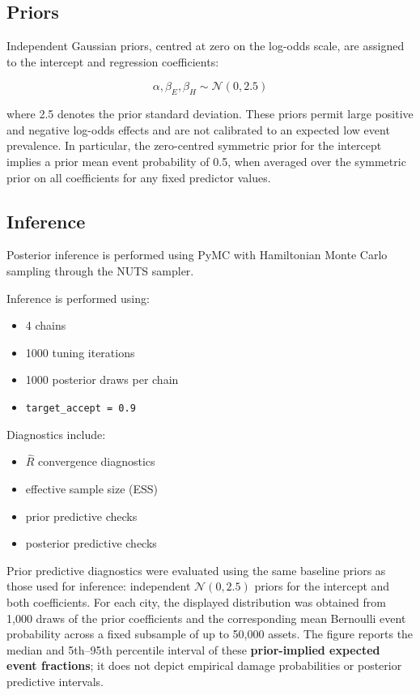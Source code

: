 \documentclass[
]{article}
\providecommand{\tightlist}{%
  \setlength{\itemsep}{0pt}\setlength{\parskip}{0pt}}
\begin{document}
\subsection{Priors}\label{priors}

Independent Gaussian priors, centred at zero on the log-odds scale, are
assigned to the intercept and regression coefficients:

\[
\alpha, \beta_E, \beta_H \sim \mathcal{N}(0, 2.5)
\]

where 2.5 denotes the prior standard deviation. These priors permit
large positive and negative log-odds effects and are not calibrated to
an expected low event prevalence. In particular, the zero-centred
symmetric prior for the intercept implies a prior mean event probability
of 0.5, when averaged over the symmetric prior on all coefficients for
any fixed predictor values.

\subsection{Inference}\label{inference}

Posterior inference is performed using PyMC with Hamiltonian Monte Carlo
sampling through the NUTS sampler.

Inference is performed using:

\begin{itemize}
\tightlist
\item
  4 chains
\item
  1000 tuning iterations
\item
  1000 posterior draws per chain
\item
  \texttt{target\_accept\ =\ 0.9}
\end{itemize}

Diagnostics include:

\begin{itemize}
\tightlist
\item
  \(\hat{R}\) convergence diagnostics
\item
  effective sample size (ESS)
\item
  prior predictive checks
\item
  posterior predictive checks
\end{itemize}

Prior predictive diagnostics were evaluated using the same baseline
priors as those used for inference: independent \(\mathcal{N}(0,2.5)\)
priors for the intercept and both coefficients. For each city, the
displayed distribution was obtained from 1,000 draws of the prior
coefficients and the corresponding mean Bernoulli event probability
across a fixed subsample of up to 50,000 assets. The figure reports the
median and 5th--95th percentile interval of these \textbf{prior-implied
expected event fractions}; it does not depict empirical damage
probabilities or posterior predictive intervals.
\end{document}
